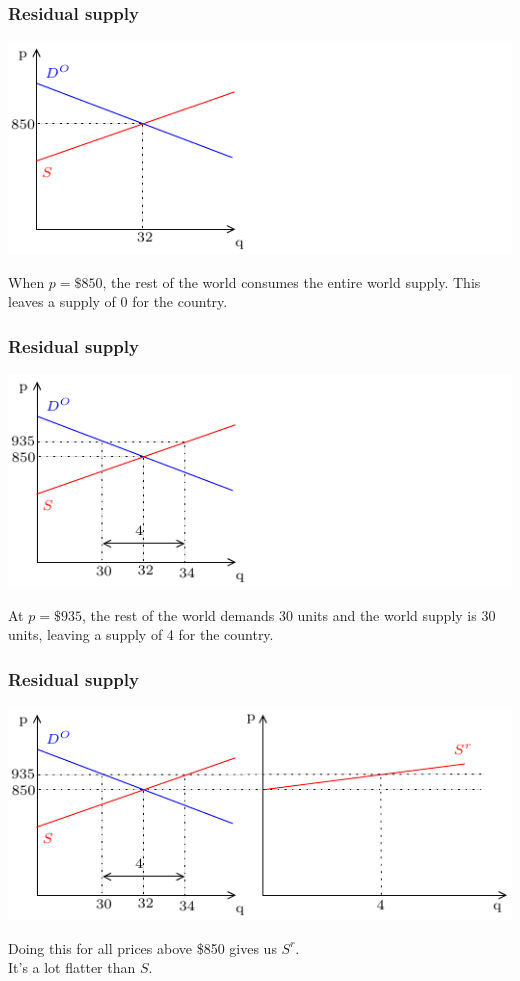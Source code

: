 \documentclass[xcolor=pdftex,dvipsnames]{beamer}
\begin{document}
\begin{frame}
\frametitle{Residual supply}
\begin{center}
\includegraphics{pics/ResS1}
\end{center}

When $p=\$850$, the rest of the world consumes the entire world
supply. This leaves a supply of 0 for the country.
\end{frame}
\begin{frame}
\frametitle{Residual supply}
\begin{center}
\includegraphics{pics/ResS2}
\end{center}

At $p=\$935$, the rest of the world demands 30 units
and the world supply is 30 units, leaving a supply of 4 for the country.
\end{frame}


\begin{frame}
\frametitle{Residual supply}
\begin{center}
\includegraphics{pics/ResS3}
\end{center}

Doing this for all prices above \$850 gives us $S^r$.\\
It's a lot flatter than $S$.
\end{frame}
\end{document}

